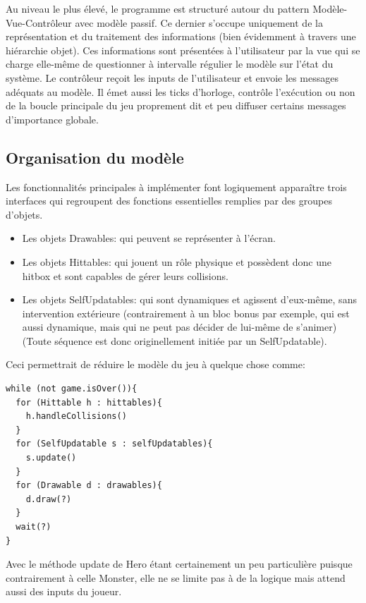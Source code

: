 \documentclass[a4paper, 12pt]{article}
\begin{document}
Au niveau le plus élevé, le programme est structuré autour du pattern Modèle-Vue-Contrôleur avec modèle passif. Ce dernier s'occupe uniquement de la représentation et du traitement des informations (bien évidemment à travers une hiérarchie objet). Ces informations sont présentées à l'utilisateur par la vue qui se charge elle-même de questionner à intervalle régulier le modèle sur l'état du système. Le contrôleur reçoit les inputs de l'utilisateur et envoie les messages adéquats au modèle. Il émet aussi les ticks d'horloge, contrôle l'exécution ou non de la boucle principale du jeu proprement dit et peu diffuser certains messages d'importance globale.

\subsection{Organisation du modèle}

Les fonctionnalités principales à implémenter font logiquement apparaître trois interfaces qui regroupent des fonctions essentielles remplies par des groupes d'objets.
\begin{itemize}
  \item Les objets Drawables: qui peuvent se représenter à l'écran.
  \item Les objets Hittables: qui jouent un rôle physique et possèdent donc une hitbox et sont capables de gérer leurs collisions.
  \item Les objets SelfUpdatables: qui sont dynamiques et agissent d'eux-même, sans intervention extérieure (contrairement à un bloc bonus par exemple, qui est aussi dynamique, mais qui ne peut pas décider de lui-même de s'animer)(Toute séquence est donc originellement initiée par un SelfUpdatable).
\end{itemize}

Ceci permettrait de réduire le modèle du jeu à quelque chose comme:

\begin{lstlisting}
while (not game.isOver()){
  for (Hittable h : hittables){
    h.handleCollisions()
  }
  for (SelfUpdatable s : selfUpdatables){
    s.update()
  }
  for (Drawable d : drawables){
    d.draw(?)
  }
  wait(?)
}
\end{lstlisting}

Avec le méthode update de Hero étant certainement un peu particulière puisque contrairement à celle Monster, elle ne se limite pas à de la logique mais attend aussi des inputs du joueur.
\end{document}
